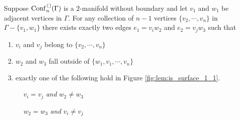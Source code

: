 \begin{lem}
    \label{lem:is_surface_1}
    Suppose \(\mathrm{Conf}^{\,\square}_n(\Gamma)\) is a \(2\)-manifold without boundary and let
    \(v_1\) and \(w_1\) be adjacent vertices in \(\Gamma\). For any collection
    of \(n-1\) vertices \(\{v_2, \cdots, v_n\}\) in \(\Gamma - \{v_1, w_1\}\)
    there exists exactly two edges \(e_1 = v_i w_2\) and \(e_2 = v_j w_3\) such that
    \begin{enumerate}[label=(\roman*)]
        \item \(v_i\) and \(v_j\) belong to \(\{v_2, \cdots, v_n\}\)
        \item \(w_2\) and \(w_3\) fall outside of \(\{w_1, v_1, \cdots, v_n\}\)
        \item exactly one of the following hold in Figure \ref{fig:lem:is_surface_1_1}.
    \end{enumerate}

\begin{figure}[h!]
    \centering
        \begin{enumerate*}[label=(\arabic*)]
            \item \label{fig:lem:is_surface_1_1:1}
            \begin{minipage}{.3\textwidth}
                \centering
                \(v_i = v_j\) \textit{and} \(w_2 \neq w_3\) \\
                \vspace{1em}
            \end{minipage}
            \hspace{3em}

            \item \label{fig:lem:is_surface_1_1:2}
            \begin{minipage}{.3\textwidth}
                \centering
                \(w_2 = w_3\) \textit{and} \(v_i \neq v_j\) \\
                \vspace{1em}
\end{minipage}
\end{enumerate*}
\end{figure}
\end{lem}
